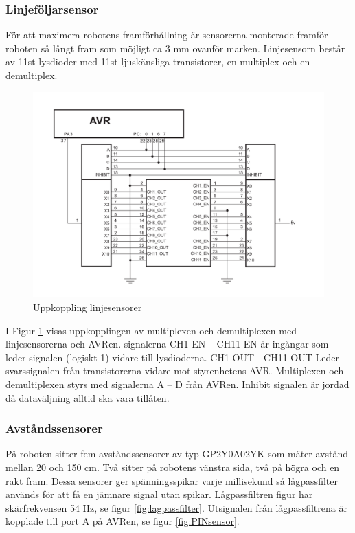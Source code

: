 \subsubsection{Linjeföljarsensor}
\label{sec:linjesensor}
För att maximera robotens framförhållning är sensorerna monterade framför roboten 
så långt fram som möjligt ca 3 mm ovanför marken. Linjesensorn består av 11st lysdioder 
med 11st ljuskänsliga transistorer, en multiplex och en demultiplex.

\begin{figure}[H]
  \centering
 \includegraphics[angle=0,scale=0.5]{bilder/Uppkoppling_linjesensorer.pdf}
  \caption{Uppkoppling linjesensorer}
  \label{fig:Uppkoppling_linjesensorer}
\end{figure}


I Figur \ref{fig:Uppkoppling_linjesensorer} visas uppkopplingen av multiplexen och
demultiplexen  med linjesensorerna och AVRen. signalerna CH1 EN – CH11 EN 
är ingångar som leder signalen (logiskt 1) vidare till lysdioderna. 
CH1  OUT - CH11 OUT Leder svarssignalen från transistorerna vidare mot styrenhetens 
AVR. Multiplexen och demultiplexen styrs med signalerna A – D från AVRen. Inhibit 
signalen är jordad då dataväljning alltid ska vara tillåten.


\subsubsection{Avståndssensorer}
På roboten sitter fem avståndssensorer av typ GP2Y0A02YK som mäter avstånd
mellan 20 och 150 cm. Två sitter på robotens vänstra sida, två på högra och en
rakt fram. Dessa sensorer ger spänningsspikar varje millisekund så lågpassfilter
används för att få en jämnare signal utan spikar. Lågpassfiltren figur
har skärfrekvensen 54 Hz, se figur \ref{fig:lagpassfilter}. Utsignalen från
lågpassfiltrena är kopplade till port A på AVRen, se figur \ref{fig:PINsensor}.

